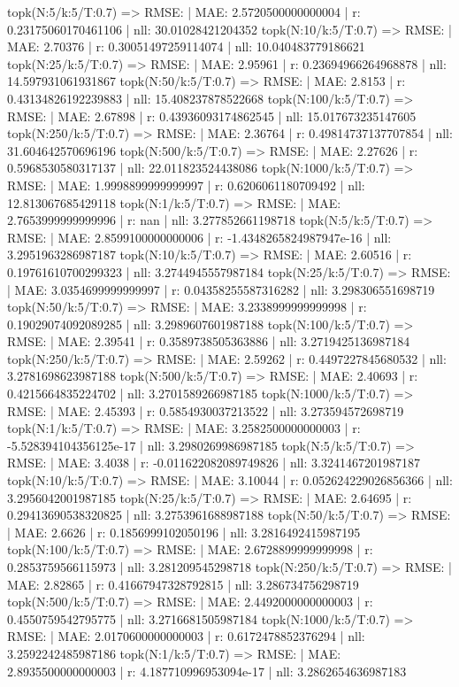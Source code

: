 topk(N:5/k:5/T:0.7) => RMSE: | MAE: 2.5720500000000004 | r: 0.23175060170461106 | nll: 30.01028421204352
topk(N:10/k:5/T:0.7) => RMSE: | MAE: 2.70376 | r: 0.30051497259114074 | nll: 10.040483779186621
topk(N:25/k:5/T:0.7) => RMSE: | MAE: 2.95961 | r: 0.23694966264968878 | nll: 14.597931061931867
topk(N:50/k:5/T:0.7) => RMSE: | MAE: 2.8153 | r: 0.43134826192239883 | nll: 15.408237878522668
topk(N:100/k:5/T:0.7) => RMSE: | MAE: 2.67898 | r: 0.43936093174862545 | nll: 15.017673235147605
topk(N:250/k:5/T:0.7) => RMSE: | MAE: 2.36764 | r: 0.49814737137707854 | nll: 31.604642570696196
topk(N:500/k:5/T:0.7) => RMSE: | MAE: 2.27626 | r: 0.5968530580317137 | nll: 22.011823524438086
topk(N:1000/k:5/T:0.7) => RMSE: | MAE: 1.9998899999999997 | r: 0.6206061180709492 | nll: 12.813067685429118
topk(N:1/k:5/T:0.7) => RMSE: | MAE: 2.7653999999999996 | r: nan | nll: 3.277852661198718
topk(N:5/k:5/T:0.7) => RMSE: | MAE: 2.8599100000000006 | r: -1.4348265824987947e-16 | nll: 3.2951963286987187
topk(N:10/k:5/T:0.7) => RMSE: | MAE: 2.60516 | r: 0.19761610700299323 | nll: 3.2744945557987184
topk(N:25/k:5/T:0.7) => RMSE: | MAE: 3.0354699999999997 | r: 0.04358255587316282 | nll: 3.298306551698719
topk(N:50/k:5/T:0.7) => RMSE: | MAE: 3.2338999999999998 | r: 0.19029074092089285 | nll: 3.2989607601987188
topk(N:100/k:5/T:0.7) => RMSE: | MAE: 2.39541 | r: 0.3589738505363886 | nll: 3.2719425136987184
topk(N:250/k:5/T:0.7) => RMSE: | MAE: 2.59262 | r: 0.4497227845680532 | nll: 3.2781698623987188
topk(N:500/k:5/T:0.7) => RMSE: | MAE: 2.40693 | r: 0.4215664835224702 | nll: 3.2701589266987185
topk(N:1000/k:5/T:0.7) => RMSE: | MAE: 2.45393 | r: 0.5854930037213522 | nll: 3.273594572698719
topk(N:1/k:5/T:0.7) => RMSE: | MAE: 3.2582500000000003 | r: -5.528394104356125e-17 | nll: 3.2980269986987185
topk(N:5/k:5/T:0.7) => RMSE: | MAE: 3.4038 | r: -0.011622082089749826 | nll: 3.3241467201987187
topk(N:10/k:5/T:0.7) => RMSE: | MAE: 3.10044 | r: 0.052624229026856366 | nll: 3.2956042001987185
topk(N:25/k:5/T:0.7) => RMSE: | MAE: 2.64695 | r: 0.29413690538320825 | nll: 3.2753961688987188
topk(N:50/k:5/T:0.7) => RMSE: | MAE: 2.6626 | r: 0.1856999102050196 | nll: 3.2816492415987195
topk(N:100/k:5/T:0.7) => RMSE: | MAE: 2.6728899999999998 | r: 0.2853759566115973 | nll: 3.281209545298718
topk(N:250/k:5/T:0.7) => RMSE: | MAE: 2.82865 | r: 0.41667947328792815 | nll: 3.286734756298719
topk(N:500/k:5/T:0.7) => RMSE: | MAE: 2.4492000000000003 | r: 0.4550759542795775 | nll: 3.2716681505987184
topk(N:1000/k:5/T:0.7) => RMSE: | MAE: 2.0170600000000003 | r: 0.6172478852376294 | nll: 3.2592242485987186
topk(N:1/k:5/T:0.7) => RMSE: | MAE: 2.8935500000000003 | r: 4.187710996953094e-17 | nll: 3.2862654636987183
